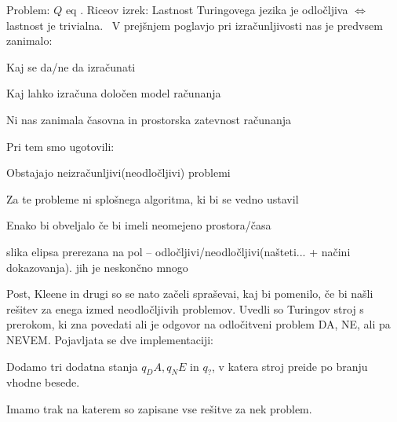 \documentclass[10pt,a4paper,oneside]{book}
\begin{document}
Problem: $Q$ eq .
Riceov izrek: Lastnost Turingovega jezika je odločljiva $\Longleftrightarrow$ lastnost je trivialna.\
\sect{Povzetek}
V prejšnjem poglavjo pri izračunljivosti nas je predvsem zanimalo:
\begin{items}
\item Kaj se da/ne da izračunati
\item Kaj lahko izračuna določen model računanja
\item Ni nas zanimala časovna in prostorska zatevnost računanja
\end{items}

Pri tem smo ugotovili:
\begin{items}
\item Obstajajo neizračunljivi(neodločljivi) problemi
\item Za te probleme ni splošnega algoritma, ki bi se vedno ustavil
\item Enako bi obveljalo če bi imeli neomejeno prostora/časa 
\end{items}

\fixme slika elipsa prerezana na pol -- odločljivi/neodločljivi(našteti... + načini dokazovanja). jih je neskončno mnogo

Post, Kleene in drugi so se nato začeli spraševai, kaj bi pomenilo, če bi našli rešitev za enega izmed neodločljivih problemov.
Uvedli so Turingov stroj s prerokom, ki zna povedati ali je odgovor na odločitveni problem DA, NE, ali pa NEVEM.
Pojavljata se dve implementaciji:
\begin{items}
\item Dodamo tri dodatna stanja $q_DA, q_NE$ in $q_?$, v katera stroj preide po branju vhodne besede.
\item Imamo trak na katerem so zapisane vse rešitve za nek problem.
\end{items}
\end{document}
